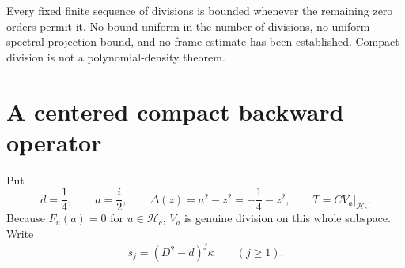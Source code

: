 \documentclass[11pt,a4paper]{article}
\numberwithin{equation}{section}
\theoremstyle{definition}
\theoremstyle{remark}
\newcommand{\Hh}{\mathcal H}
\begin{document}
Every fixed finite sequence of divisions is bounded whenever the remaining zero orders permit it. No bound uniform in the number of divisions, no uniform spectral-projection bound, and no frame estimate has been established. Compact division is not a polynomial-density theorem.

\section{A centered compact backward operator}\label{sec:model}

Put
\begin{equation}\label{eq:d-delta-T}
 d=\frac14,\qquad a=\frac i2,\qquad
 \Delta(z)=a^2-z^2=-\frac14-z^2,\qquad
 T=CV_a|_{\Hh_c}.
\end{equation}
Because $F_u(a)=0$ for $u\in\Hh_c$, $V_a$ is genuine division on this whole subspace. Write
\begin{equation}\label{eq:sj}
 s_j=(D^2-d)^j\kappa\qquad(j\ge1).
\end{equation}
\end{document}
